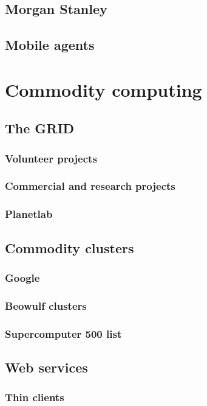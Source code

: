 \subsection{Morgan Stanley}
\subsection{Mobile agents}

\section{Commodity computing}

\subsection{The GRID}
\subsubsection{Volunteer projects}
\subsubsection{Commercial and research projects}
\subsubsection{Planetlab}

\subsection{Commodity clusters}
\subsubsection{Google}
\subsubsection{Beowulf clusters}
\subsubsection{Supercomputer 500 list}

\subsection{Web services}
\subsubsection{Thin clients}
